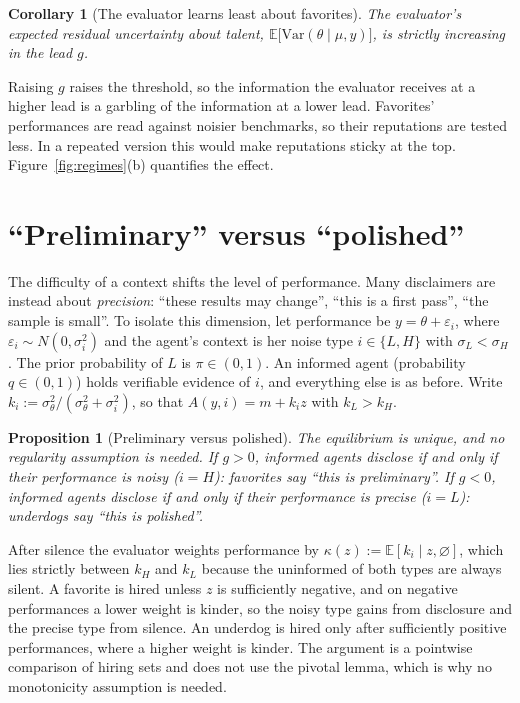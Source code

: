 \documentclass[11pt]{article}
\newtheorem{proposition}{Proposition}
\newtheorem{corollary}{Corollary}
\theoremstyle{definition}
\newcommand{\E}{\mathbb{E}}
\newcommand{\Var}{\mathrm{Var}}
\newcommand{\sil}{\varnothing}
\newcommand{\sth}{\sigma_\theta}
\begin{document}
\begin{corollary}[The evaluator learns least about favorites]\label{cor:learning}
The evaluator's expected residual uncertainty about talent, $\E\big[\Var(\theta\mid\mu,y)\big]$, is strictly increasing in the lead $g$.
\end{corollary}

Raising $g$ raises the threshold, so the information the evaluator receives at a higher lead is a garbling of the information at a lower lead. Favorites' performances are read against noisier benchmarks, so their reputations are tested less. In a repeated version this would make reputations sticky at the top. Figure~\ref{fig:regimes}(b) quantifies the effect.

\section{``Preliminary'' versus ``polished''}\label{sec:noise}

The difficulty of a context shifts the level of performance. Many disclaimers are instead about \emph{precision}: ``these results may change'', ``this is a first pass'', ``the sample is small''. To isolate this dimension, let performance be $y=\theta+\varepsilon_i$, where $\varepsilon_i\sim N(0,\sigma_i^2)$ and the agent's context is her noise type $i\in\{L,H\}$ with $\sigma_L<\sigma_H$. The prior probability of $L$ is $\pi\in(0,1)$. An informed agent (probability $q\in(0,1)$) holds verifiable evidence of $i$, and everything else is as before. Write $k_i:=\sth^2/(\sth^2+\sigma_i^2)$, so that $A(y,i)=m+k_i z$ with $k_L>k_H$.

\begin{proposition}[Preliminary versus polished]\label{prop:noise}
The equilibrium is unique, and no regularity assumption is needed. If $g>0$, informed agents disclose if and only if their performance is noisy ($i=H$): favorites say ``this is preliminary''. If $g<0$, informed agents disclose if and only if their performance is precise ($i=L$): underdogs say ``this is polished''.
\end{proposition}

After silence the evaluator weights performance by $\kappa(z):=\E[k_i\mid z,\sil]$, which lies strictly between $k_H$ and $k_L$ because the uninformed of both types are always silent. A favorite is hired unless $z$ is sufficiently negative, and on negative performances a lower weight is kinder, so the noisy type gains from disclosure and the precise type from silence. An underdog is hired only after sufficiently positive performances, where a higher weight is kinder. The argument is a pointwise comparison of hiring sets and does not use the pivotal lemma, which is why no monotonicity assumption is needed.
\end{document}
